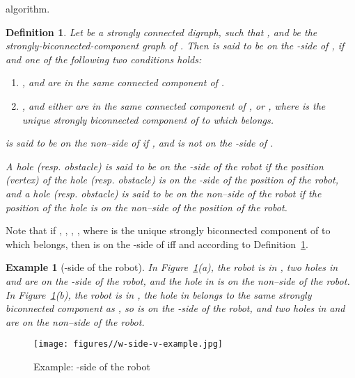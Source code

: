 \documentclass{article}
\newtheorem{defn}[thm]{Definition}
\newtheorem{exmp}[thm]{Example}
\begin{document}
algorithm.
\begin{defn}\label{defn:w-side-v}
Let  be a strongly connected digraph,  such
that , and  be the strongly-biconnected-component graph of . Then
 is said to be on the -side of , if  and one of
the following two conditions holds:
\begin{enumerate}
\item , and  are in the same connected component of .

\item , and either  are in the same connected component of , or
, where  is the unique strongly biconnected component
of  to which  belongs.
\end{enumerate}
 is said to be on the non--side of  if , and 
is not on the -side of .

A hole (resp. obstacle) is said to be on the -side of the robot
if the position (vertex) of the hole (resp. obstacle) is on the
-side of the position of the robot, and a hole (resp. obstacle)
is said to be on the non--side of the robot if the position of
the hole is on the non--side of the position of the robot.
\end{defn}


Note that if , , , , where  is the unique strongly biconnected component of
 to which  belongs, then  is on the -side of  iff  and  according to Definition~\ref{defn:w-side-v}.

\begin{exmp}[-side of the robot]
In Figure~\ref{fig:w-side-v-example}(a), the robot is in , two holes in  and  are on the -side of the
robot, and the hole in  is on the non--side of the robot. In
Figure~\ref{fig:w-side-v-example}(b), the robot is in , the hole in  belongs to the same strongly biconnected
component as , so  is on the -side of the robot, and
two holes in  and  are on the non--side of the robot.
\end{exmp}

\begin{figure}[ht]
\centering
  \texttt{[image: figures//w-side-v-example.jpg]}
  \caption{Example: -side of the robot}\label{fig:w-side-v-example}
\end{figure}
\end{document}
